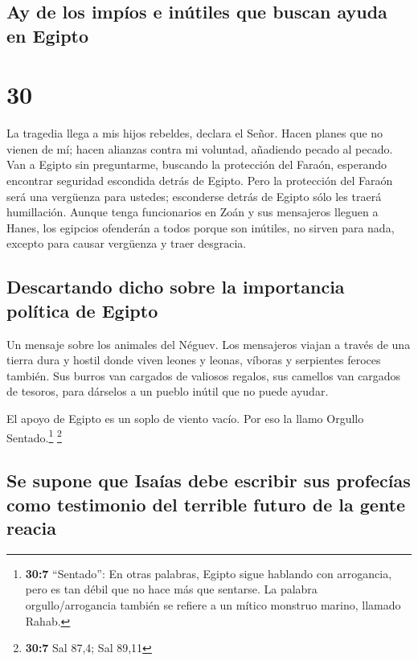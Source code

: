 \hypertarget{ay-de-los-impuxedos-e-inuxfatiles-que-buscan-ayuda-en-egipto}{%
\subsection{Ay de los impíos e inútiles que buscan ayuda en
Egipto}\label{ay-de-los-impuxedos-e-inuxfatiles-que-buscan-ayuda-en-egipto}}

\hypertarget{section-29}{%
\section{30}\label{section-29}}

 La tragedia llega a mis hijos rebeldes, declara el Señor.
Hacen planes que no vienen de mí; hacen alianzas contra mi voluntad,
añadiendo pecado al pecado.  Van a Egipto sin preguntarme,
buscando la protección del Faraón, esperando encontrar seguridad
escondida detrás de Egipto.  Pero la protección del Faraón
será una vergüenza para ustedes; esconderse detrás de Egipto sólo les
traerá humillación.  Aunque tenga funcionarios en Zoán y
sus mensajeros lleguen a Hanes,  los egipcios ofenderán a
todos porque son inútiles, no sirven para nada, excepto para causar
vergüenza y traer desgracia.

\hypertarget{descartando-dicho-sobre-la-importancia-poluxedtica-de-egipto}{%
\subsection{Descartando dicho sobre la importancia política de
Egipto}\label{descartando-dicho-sobre-la-importancia-poluxedtica-de-egipto}}

 Un mensaje sobre los animales del Néguev. Los mensajeros
viajan a través de una tierra dura y hostil donde viven leones y leonas,
víboras y serpientes feroces también. Sus burros van cargados de
valiosos regalos, sus camellos van cargados de tesoros, para dárselos a
un pueblo inútil que no puede ayudar.

 El apoyo de Egipto es un soplo de viento vacío. Por eso
la llamo Orgullo Sentado.\footnote{\textbf{30:7} ``Sentado'': En otras
  palabras, Egipto sigue hablando con arrogancia, pero es tan débil que
  no hace más que sentarse. La palabra orgullo/arrogancia también se
  refiere a un mítico monstruo marino, llamado Rahab.} \footnote{\textbf{30:7}
  Sal 87,4; Sal 89,11}

\hypertarget{se-supone-que-isauxedas-debe-escribir-sus-profecuxedas-como-testimonio-del-terrible-futuro-de-la-gente-reacia}{%
\subsection{Se supone que Isaías debe escribir sus profecías como
testimonio del terrible futuro de la gente
reacia}\label{se-supone-que-isauxedas-debe-escribir-sus-profecuxedas-como-testimonio-del-terrible-futuro-de-la-gente-reacia}}

